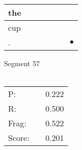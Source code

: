\documentclass[landscape]{article}
\newcommand{\ssp}{\hspace{2pt}}
\newcommand{\mex}{\cellcolor{g}$\bullet$}
\begin{document}
\begin{tabular}{|l|p{10pt}|p{10pt}|p{10pt}|p{10pt}|p{10pt}|p{10pt}|}
\hline
\ssp the \ssp&\hspace{2pt}&\hspace{2pt}&\hspace{2pt}&\hspace{2pt}&\hspace{2pt}&\hspace{2pt}\\
\hline
\ssp cup \ssp&\hspace{2pt}&\hspace{2pt}&\hspace{2pt}&\hspace{2pt}&\hspace{2pt}&\hspace{2pt}\\
\hline
\ssp \cellcolor{ref5}. \ssp&\hspace{2pt}&\hspace{2pt}&\hspace{2pt}&\hspace{2pt}&\hspace{2pt}&\hspace{2pt}\mex\\
\hline
\end{tabular}

\vspace{6pt}
\noindent Segment 57\\\\
\noindent\begin{tabular}{lm{12pt}r}
\hline
P:&&0.222\\
R:&&0.500\\
Frag:&&0.522\\
Score:&&0.201\\
\end{tabular}

\newpage
\end{document}
